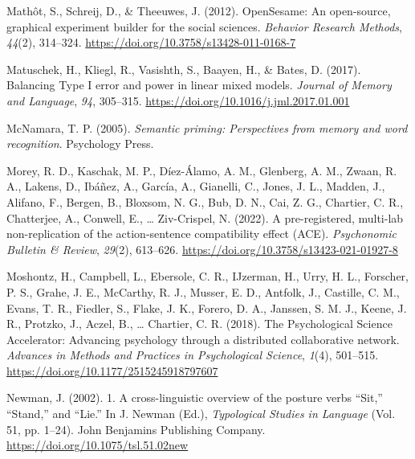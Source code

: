 \documentclass[
  man,floatsintext]{apa7}
\newlength{\cslhangindent}
\newlength{\cslentryspacingunit} %
\newenvironment{CSLReferences}[2] %
 {%
  \setlength{\parindent}{0pt}
  \ifodd #1
  \let\oldpar\par
  \def\par{\hangindent=\cslhangindent\oldpar}
  \fi
  \setlength{\parskip}{#2\cslentryspacingunit}
 }%
 {}
\begin{document}
\begin{CSLReferences}{1}{0}
\leavevmode{}%
Mathôt, S., Schreij, D., \& Theeuwes, J. (2012). {OpenSesame}: {An} open-source, graphical experiment builder for the social sciences. \emph{Behavior Research Methods}, \emph{44}(2), 314--324. \url{https://doi.org/10.3758/s13428-011-0168-7}

\leavevmode{}%
Matuschek, H., Kliegl, R., Vasishth, S., Baayen, H., \& Bates, D. (2017). Balancing Type I error and power in linear mixed models. \emph{Journal of Memory and Language}, \emph{94}, 305--315. \url{https://doi.org/10.1016/j.jml.2017.01.001}

\leavevmode{}%
McNamara, T. P. (2005). \emph{Semantic {priming}: {Perspectives from memory} and {word recognition}}. {Psychology Press}.

\leavevmode{}%
Morey, R. D., Kaschak, M. P., Díez-Álamo, A. M., Glenberg, A. M., Zwaan, R. A., Lakens, D., Ibáñez, A., García, A., Gianelli, C., Jones, J. L., Madden, J., Alifano, F., Bergen, B., Bloxsom, N. G., Bub, D. N., Cai, Z. G., Chartier, C. R., Chatterjee, A., Conwell, E., \ldots{} Ziv-Crispel, N. (2022). A pre-registered, multi-lab non-replication of the action-sentence compatibility effect (ACE). \emph{Psychonomic Bulletin \& Review}, \emph{29}(2), 613--626. \url{https://doi.org/10.3758/s13423-021-01927-8}

\leavevmode{}%
Moshontz, H., Campbell, L., Ebersole, C. R., IJzerman, H., Urry, H. L., Forscher, P. S., Grahe, J. E., McCarthy, R. J., Musser, E. D., Antfolk, J., Castille, C. M., Evans, T. R., Fiedler, S., Flake, J. K., Forero, D. A., Janssen, S. M. J., Keene, J. R., Protzko, J., Aczel, B., \ldots{} Chartier, C. R. (2018). The {Psychological Science Accelerator}: {Advancing} psychology through a distributed collaborative network. \emph{Advances in Methods and Practices in Psychological Science}, \emph{1}(4), 501--515. \url{https://doi.org/10.1177/2515245918797607}

\leavevmode{}%
Newman, J. (2002). 1. {A} cross-linguistic overview of the posture verbs {``{Sit},''} {``{Stand},''} and {``{Lie}.''} In J. Newman (Ed.), \emph{Typological {Studies} in {Language}} (Vol. 51, pp. 1--24). {John Benjamins Publishing Company}. \url{https://doi.org/10.1075/tsl.51.02new}


\end{CSLReferences}
\end{document}
